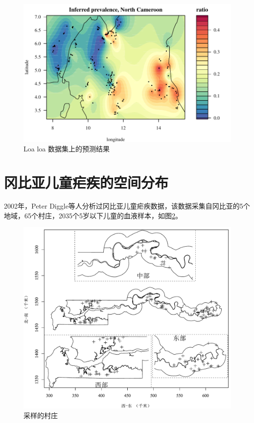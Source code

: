 \documentclass[hyperref, a4paper, UTF8, zihao = -4, linespread = 1.25, scheme = chinese]{ctexbook}
\begin{document}
\begin{figure}

{\centering \includegraphics[width=0.7\linewidth]{figures/spaMM-loaloa} 

}

\caption{Loa loa 数据集上的预测结果}\label{fig:spamm-loaloa}
\end{figure}

\section{冈比亚儿童疟疾的空间分布}

2002年，Peter
Diggle等人分析过冈比亚儿童疟疾数据，该数据采集自冈比亚的5个地域，65个村庄，2035个5岁以下儿童的血液样本，如图\ref{fig:map-gambia}。

\begin{figure}

{\centering \includegraphics[width=0.7\linewidth]{figures/gambia-map} 

}

\caption{采样的村庄}\label{fig:map-gambia}
\end{figure}
\end{document}
